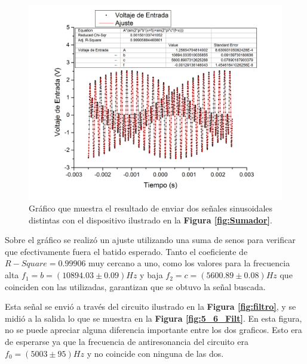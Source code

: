 \documentclass[11pt,a4paper]{article}
\begin{document}
\begin{figure}[H]
\centering
\includegraphics[scale=0.4]{5600hz.jpg}
\caption{Gráfico que muestra el resultado de enviar dos señales sinusoidales distintas con el dispositivo ilustrado en la \textbf{Figura \ref{fig:Sumador}}.}
\label{fig:5_6}
\end{figure}

Sobre el gráfico se realizó un ajuste utilizando una suma de senos para verificar que efectivamente fuera el batido esperado. Tanto el coeficiente de $R-Square = 0.99906$ muy cercano a uno, como los valores para la frecuencia alta $f_1=b = (10894.03 \pm 0.09)Hz$ y baja $f_2=c = (5600.89 \pm 0.08)Hz$ que coinciden con las utilizadas, garantizan que se obtuvo la señal buscada.

Esta señal se envió a través del circuito ilustrado en la \textbf{Figura \ref{fig:filtro}}, y se midió a la salida lo que se muestra en la \textbf{Figura \ref{fig:5_6_Filt}}. En esta figura, no se puede apreciar alguna diferencia importante entre los dos graficos. Esto era de esperarse ya que la frecuencia de antiresonancia del circuito era $f_0= (5003 \pm 95)Hz$ y no coincide con ninguna de las dos.
\end{document}
